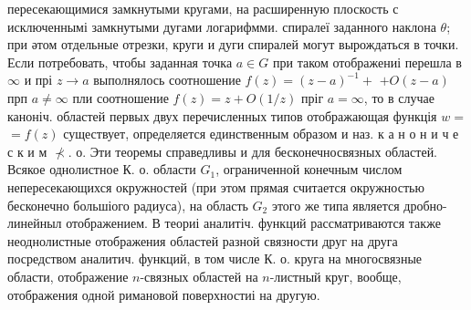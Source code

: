 \documentclass[10pt]{article}
\begin{document}
пересекающимися замкнутыми кругами, на расширенную плоскость с исключеннымі замкнутыми дугами логарифмми. спиралеї заданного наклона $\theta$; при әтом отдельные отрезки, круги и дуги спиралей могут вырождаться в точки. Если потребовать, чтобы заданная точка $a \in G$ при таком отображениі перешла в $\infty$ и прі $z \rightarrow a$ выполнялось соотношение $f(z)=(z-a)^{-1}+$ $+O(z-a)$ прп $a \neq \infty$ пли соотношение $f(z)=z+O(1 / z)$ пріг $a=\infty$, то в случае каноніч. областей первых двух перечисленных типов отображающая функція $w=$ $=f(z)$ существует, определяется единственным образом и наз. к а н о н и ч е с к и м $\nprec$. о. Эти теоремы справедливы и для бесконечносвязных областей. Всякое однолистное К. о. области $G_{1}$, ограниченной конечным числом непересекающихся окружностей (при этом прямая считается окружностью бесконечно большіого радиуса), на область $G_{2}$ этого же типа является дробно-линейныл отображением. В теориі аналитіч. функций рассматриваются также неоднолистные отображения областей разной связности друг на друга посредством аналитич. функций, в том числе К. о. круга на многосвязные области, отображение $n$-связных областей на $n$-листный круг, вообще, отображения одной римановой поверхностиі на другую.
\end{document}
